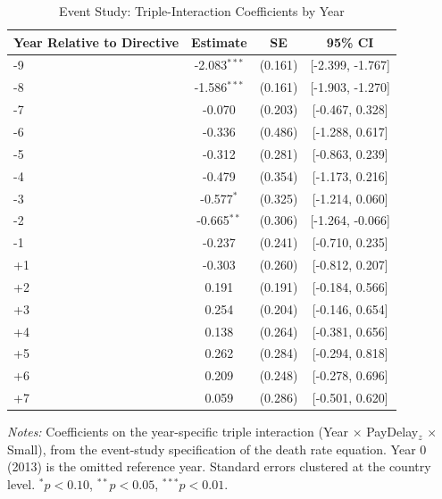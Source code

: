 \begin{table}[htbp]
\centering
\caption{Event Study: Triple-Interaction Coefficients by Year}
\label{tab:eventstudy}
\begin{tabular}{lccc}
\hline\hline
Year Relative to Directive & Estimate & SE & 95\% CI \\
\hline
-9 & -2.083$^{***}$ & (0.161) & [-2.399, -1.767] \\
-8 & -1.586$^{***}$ & (0.161) & [-1.903, -1.270] \\
-7 & -0.070 & (0.203) & [-0.467, 0.328] \\
-6 & -0.336 & (0.486) & [-1.288, 0.617] \\
-5 & -0.312 & (0.281) & [-0.863, 0.239] \\
-4 & -0.479 & (0.354) & [-1.173, 0.216] \\
-3 & -0.577$^{*}$ & (0.325) & [-1.214, 0.060] \\
-2 & -0.665$^{**}$ & (0.306) & [-1.264, -0.066] \\
-1 & -0.237 & (0.241) & [-0.710, 0.235] \\
+1 & -0.303 & (0.260) & [-0.812, 0.207] \\
+2 & 0.191 & (0.191) & [-0.184, 0.566] \\
+3 & 0.254 & (0.204) & [-0.146, 0.654] \\
+4 & 0.138 & (0.264) & [-0.381, 0.656] \\
+5 & 0.262 & (0.284) & [-0.294, 0.818] \\
+6 & 0.209 & (0.248) & [-0.278, 0.696] \\
+7 & 0.059 & (0.286) & [-0.501, 0.620] \\
\hline\hline
\end{tabular}
\begin{tablenotes}[flushleft]\footnotesize
\item \textit{Notes:} Coefficients on the year-specific triple interaction (Year $\times$ PayDelay$_z$ $\times$ Small), from the event-study specification of the death rate equation. Year 0 (2013) is the omitted reference year. Standard errors clustered at the country level. $^{*}p<0.10$, $^{**}p<0.05$, $^{***}p<0.01$.
\end{tablenotes}
\end{table}

